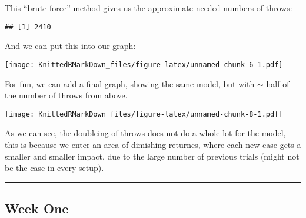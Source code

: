 \documentclass[]{article}
\begin{document}
This ``brute-force'' method gives us the approximate needed numbers of
throws:

\begin{verbatim}
## [1] 2410
\end{verbatim}

And we can put this into our graph:

\texttt{[image: KnittedRMarkDown\_files/figure-latex/unnamed-chunk-6-1.pdf]}

For fun, we can add a final graph, showing the same model, but with
\(\sim\) half of the number of throws from above.

\texttt{[image: KnittedRMarkDown\_files/figure-latex/unnamed-chunk-8-1.pdf]}

As we can see, the doubleing of throws does not do a whole lot for the
model, this is because we enter an area of dimishing returnes, where
each new case gets a smaller and smaller impact, due to the large number
of previous trials (might not be the case in every setup).

\begin{center}\rule{0.5\linewidth}{\linethickness}\end{center}

\hypertarget{week-one-1}{%
\subsection{Week One}\label{week-one-1}}
\end{document}
